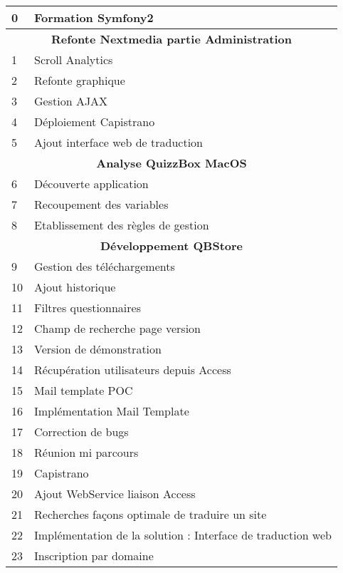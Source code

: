\begin{table}[]
\centering
\begin{tabular}{|l|l|}
\hline
0 & Formation Symfony2 \\ \hline
\multicolumn{2}{|c|}{\textbf{Refonte Nextmedia partie Administration}} \\ \hline
1 & Scroll Analytics \\ \hline
2 & Refonte graphique \\ \hline
3 & Gestion AJAX \\ \hline
4 & Déploiement Capistrano \\ \hline
5 & Ajout interface web de traduction \\ \hline
\multicolumn{2}{|c|}{\textbf{Analyse QuizzBox MacOS}} \\ \hline
6 & Découverte application \\ \hline
7 & Recoupement des variables \\ \hline
8 & Etablissement des règles de gestion \\ \hline
\multicolumn{2}{|c|}{\textbf{Développement QBStore}} \\ \hline
9 & Gestion des téléchargements \\ \hline
10 & Ajout historique \\ \hline
11 & Filtres questionnaires \\ \hline
12 & Champ de recherche page version \\ \hline
13 & Version de démonstration \\ \hline
14 & Récupération utilisateurs depuis Access \\ \hline
15 & Mail template POC \\ \hline
16 & Implémentation Mail Template \\ \hline
17 & Correction de bugs \\ \hline
18 & Réunion mi parcours \\ \hline
19 & Capistrano \\ \hline
20 & Ajout WebService liaison Access \\ \hline
21 & Recherches façons optimale de traduire un site \\ \hline
22 & Implémentation de la solution : Interface de traduction web \\ \hline
23 & Inscription par domaine \\ \hline
\end{tabular}
\end{table}
